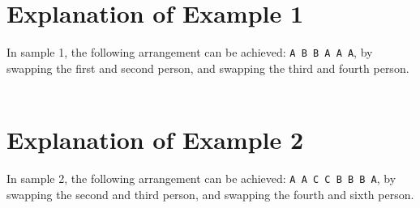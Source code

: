 \section*{Explanation of Example 1}
In sample 1, the following arrangement can be achieved: \texttt{A B B A A A}, by swapping the first and second person, and swapping the third and fourth person. \\ \\
\section*{Explanation of Example 2}
In sample 2, the following arrangement can be achieved: \texttt{A A C C B B B A}, by swapping the second and third person, and swapping the fourth and sixth person.